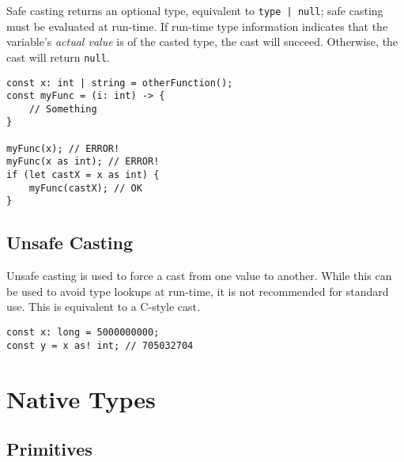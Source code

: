 \documentclass[12pt]{article}
\begin{document}
Safe casting returns an optional type, equivalent to \lstinline!type | null!; safe casting must be evaluated at run-time. If run-time type information indicates that the variable's \emph{actual value} is of the casted type, the cast will succeed. Otherwise, the cast will return \lstinline!null!.

\begin{lstlisting}
const x: int | string = otherFunction();
const myFunc = (i: int) -> {
	// Something
}

myFunc(x); // ERROR!
myFunc(x as int); // ERROR!
if (let castX = x as int) {
	myFunc(castX); // OK
}
\end{lstlisting}

\subsection{Unsafe Casting}

Unsafe casting is used to force a cast from one value to another. While this can be used to avoid type lookups at run-time, it is not recommended for standard use. This is equivalent to a C-style cast.

\begin{lstlisting}
const x: long = 5000000000;
const y = x as! int; // 705032704
\end{lstlisting}

\section{Native Types}

\subsection{Primitives}
\end{document}
